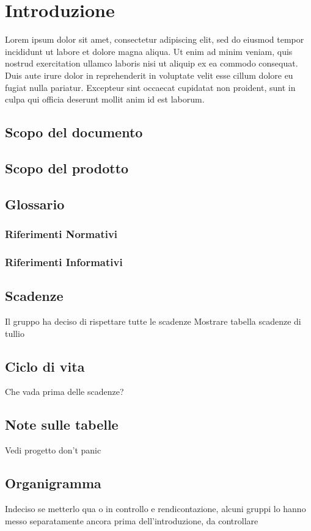 \newpage
\section{Introduzione} \label{Introduzione}
	
	Lorem ipsum dolor sit amet, consectetur adipiscing elit, sed do eiusmod tempor incididunt ut labore et dolore magna aliqua. Ut enim ad minim veniam, quis nostrud exercitation ullamco laboris nisi ut aliquip ex ea commodo consequat. Duis aute irure dolor in reprehenderit in voluptate velit esse cillum dolore eu fugiat nulla pariatur. Excepteur sint occaecat cupidatat non proident, sunt in culpa qui officia deserunt mollit anim id est laborum.
	
	\subsection{Scopo del documento}
	\subsection{Scopo del prodotto}	
	\subsection{Glossario}
		\subsubsection{Riferimenti Normativi}
		\subsubsection{Riferimenti Informativi}
	\subsection{Scadenze}
	Il gruppo ha deciso di rispettare tutte le scadenze
	Mostrare tabella scadenze di tullio
	\subsection{Ciclo di vita}
	Che vada prima delle scadenze?
	
	\subsection{Note sulle tabelle}
	Vedi progetto don't panic
	
	\subsection{Organigramma}
	Indeciso se metterlo qua o in controllo e rendicontazione, alcuni gruppi lo hanno messo separatamente ancora prima dell'introduzione, da controllare
